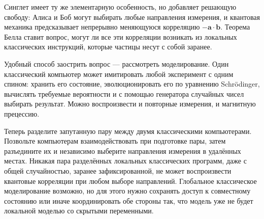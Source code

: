 Синглет имеет ту же элементарную особенность, но добавляет решающую свободу: Алиса и Боб могут выбирать любые направления измерения, и квантовая механика предсказывает непрерывно меняющуюся корреляцию \(-\bm a\cdot\bm b\). Теорема Белла ставит вопрос, могут ли все эти корреляции возникать из локальных классических инструкций, которые частицы несут с собой заранее.

\begin{classroomqa}
\end{classroomqa}

\begin{classroomqa}
\end{classroomqa}

Удобный способ заострить вопрос — рассмотреть моделирование. Один классический компьютер может имитировать любой эксперимент с одним спином: хранить его состояние, эволюционировать его по уравнению Schr\"odinger, вычислять требуемые вероятности и с помощью генератора случайных чисел выбирать результат. Можно воспроизвести и повторные измерения, и магнитную прецессию.

Теперь разделите запутанную пару между двумя классическими компьютерами. Позвольте компьютерам взаимодействовать при подготовке пары, затем разъедините их и независимо выберите направления измерения в удалённых местах. Никакая пара разделённых локальных классических программ, даже с общей случайностью, заранее зафиксированной, не может воспроизвести квантовые корреляции при любом выборе направлений. Глобальное классическое моделирование возможно, но для этого нужно сохранять доступ к совместному состоянию или иначе координировать обе стороны так, что модель уже не будет локальной моделью со скрытыми переменными.


